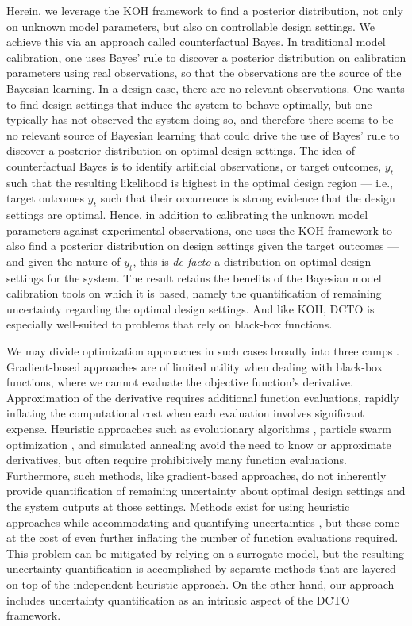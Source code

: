 \documentclass[12pt]{article}
\begin{document}
%
Herein, we leverage the KOH framework to find a posterior distribution, not only on unknown model parameters, but also on controllable design settings.
%
We achieve this via an approach called counterfactual Bayes.
%
In traditional model calibration, one uses Bayes' rule to discover a posterior distribution on calibration parameters using real observations, so that the observations are the source of the Bayesian learning.
%
In a design case, there are no relevant observations.
%
One wants to find design settings that induce the system to behave optimally, but one typically has not observed the system doing so, and therefore there seems to be no relevant source of Bayesian learning that could drive the use of Bayes' rule to discover a posterior distribution on optimal design settings.
%
The idea of counterfactual Bayes is to identify artificial observations, or target outcomes, $y_t$ such that the resulting likelihood is highest in the optimal design region --- i.e., target outcomes $y_t$ such that their occurrence is strong evidence that the design settings are optimal.
%
Hence, in addition to calibrating the unknown model parameters against experimental observations, one uses the KOH framework to also find a posterior distribution on design settings given the target outcomes --- and given the nature of $y_t$, this is \textit{de facto} a distribution on optimal design settings for the system.
%
The result retains the benefits of the Bayesian model calibration tools on which it is based, namely the quantification of remaining uncertainty regarding the optimal design settings.
%
And like KOH, DCTO is especially well-suited to problems that rely on black-box functions.
%

%
We may divide optimization approaches in such cases broadly into three camps \citep{Regis2004}.
%
Gradient-based approaches \citep{Nocedal2006} are of limited utility when dealing with black-box functions, where we cannot evaluate the objective function's derivative.
%
Approximation of the derivative requires additional function evaluations, rapidly inflating the computational cost when each evaluation involves significant expense.
%
Heuristic approaches \citep{Lee2007} such as evolutionary algorithms \citep{Branke2008,Deb2002,Kim2004}, particle swarm optimization \citep{Bonyadi2017,Mason2017}, and simulated annealing \citep{Robert2004} avoid the need to know or approximate derivatives, but often require prohibitively many function evaluations.
%
Furthermore, such methods, like gradient-based approaches, do not inherently provide quantification of remaining uncertainty about optimal design settings and the system outputs at those settings.
%
Methods exist for using heuristic approaches while accommodating and quantifying uncertainties \citep{Deb2006,Zhou2011b}, but these come at the cost of even further inflating the number of function evaluations required.
%
This problem can be mitigated by relying on a surrogate model, but the resulting uncertainty quantification is accomplished by separate methods that are layered on top of the independent heuristic approach.
%
On the other hand, our approach includes uncertainty quantification as an intrinsic aspect of the DCTO framework.
%
\end{document}

